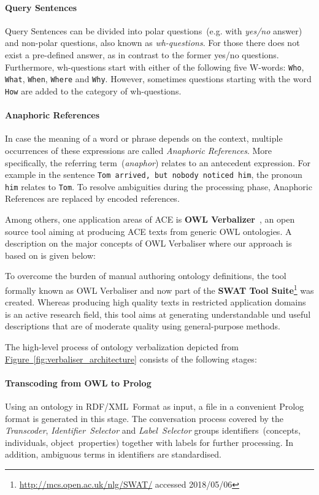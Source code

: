 \documentclass[draft,final]{vutinfth} %
\begin{document}
\paragraph{Query Sentences} Query Sentences can be divided into polar questions~(e.g. with \textit{yes/no} answer) and non-polar questions, also known as \emph{wh-questions}. For those there does not exist a pre-defined answer, as in contrast to the former yes/no questions. Furthermore, wh-questions start with either of the following five W-words: \texttt{Who}, \texttt{What}, \texttt{When}, \texttt{Where} and \texttt{Why}. However, sometimes questions starting with the word \texttt{How} are added to the category of wh-questions.

\paragraph{Anaphoric References} In case the meaning of a word or phrase depends on the context, multiple occurrences of these expressions are called \textit{Anaphoric References}. More specifically, the referring term~(\textit{anaphor}) relates to an antecedent expression. For example in the sentence \texttt{Tom arrived, but nobody noticed him}, the pronoun \texttt{him} relates to \texttt{Tom}. To resolve ambiguities during the processing phase, Anaphoric References are replaced by encoded references. 

Among others, one application areas of ACE is \textbf{OWL Verbalizer}~\cite{stevens2011}, an open source tool aiming at producing ACE texts from generic OWL ontologies. A description on the major concepts of OWL Verbaliser where our approach is based on is given below:

To overcome the burden of manual authoring ontology definitions, the tool formally known as OWL Verbaliser and now part of the \textbf{SWAT Tool Suite}\footnote{\url{http://mcs.open.ac.uk/nlg/SWAT/} accessed 2018/05/06} was created. Whereas producing high quality texts in restricted application domains is an active research field, this tool aims at generating understandable und useful descriptions that are of moderate quality using general-purpose methods.

The high-level process of ontology verbalization depicted from \hyperref[fig:verbaliser_architecture]{Figure~\ref*{fig:verbaliser_architecture}} consists of the following stages:

\paragraph{Transcoding from OWL to Prolog} Using an ontology in RDF/XML~Format as input, a file in a convenient Prolog format is generated in this
stage. The conversation process covered by the \textit{Transcoder}, \textit{Identifier~Selector} and \textit{Label~Selector} groups identifiers~(concepts, individuals, object~properties) together with labels for further processing. In addition, ambiguous terms in identifiers are standardised. 
\end{document}
